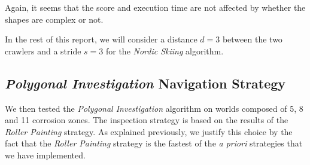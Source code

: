 Again, it seems that the score and execution time are not affected by whether the shapes are complex or not.

In the rest of this report, we will consider a distance $d = 3$ between the two crawlers and a stride $s = 3$ for the \textit{Nordic Skiing} algorithm.

\subsection*{\textit{Polygonal Investigation} Navigation Strategy}

We then tested the \textit{Polygonal Investigation} algorithm on worlds composed of 5, 8 and 11 corrosion zones.
The inspection strategy is based on the results of the \textit{Roller Painting} strategy.
As explained previously, we justify this choice by the fact that the \textit{Roller Painting} strategy is the fastest of the \textit{a priori} strategies that we have implemented.


